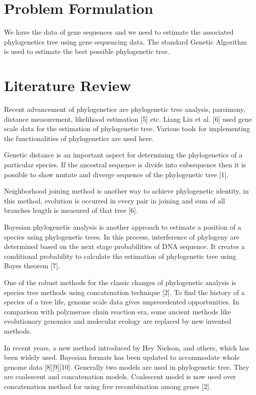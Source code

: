 \documentclass[preprint,12pt]{elsarticle}
\begin{document}
\section{Problem Formulation}
We have the data of gene sequences and we need to estimate the associated phylogenetics tree using gene sequencing data. The standard Genetic Algorithm is used to estimate the best possible phylogenetic tree. 

\section{Literature Review}
\label{S:2}
Recent advancement of phylogenetics are phylogenetic tree analysis, parsimony, distance measurement, likelihood estimation [5] etc. Liang Liu et al. [6] used gene scale data for the estimation of phylogenetic tree. Various tools for implementing the functionalities of phylogenetics are used here.


Genetic distance is an important aspect for determining the phylogenetics of a particular species. If the ancestral sequence is divide into subsequence then it is possible to show mutate and diverge sequence of the phylogenetic tree [1]. 


Neighborhood joining method is another way to achieve phylogenetic identity, in this method, evolution is occurred in every pair in joining and sum of all branches length is measured of that tree [6].


Bayesian phylogenetic analysis is another approach to estimate a position of a species using phylogenetic trees. In this process, interference of phylogeny are determined based on the next stage probabilities of DNA sequence. It creates a conditional probability to calculate the estimation of phylogenetic tree using Bayes theorem [7].


One of the robust methods for the classic changes of phylogenetic analysis is species tree methods using concatenation technique [2]. To find the history of a species of a tree life, genome scale data gives unprecedented opportunities. In comparison with polymerase chain reaction era, some ancient methods like evolutionary genomics and molecular ecology are replaced by new invented methods. 


In recent years, a new method introduced by Hey Nielson, and others, which has been widely used. Bayesian formats has been updated to accommodate whole genome data [8][9][10]. 
Generally two models are used in phylogenetic tree. They are coalescent and concatenation models. Coalescent model is now used over concatenation method for using free recombination among genes [2].
\end{document}
